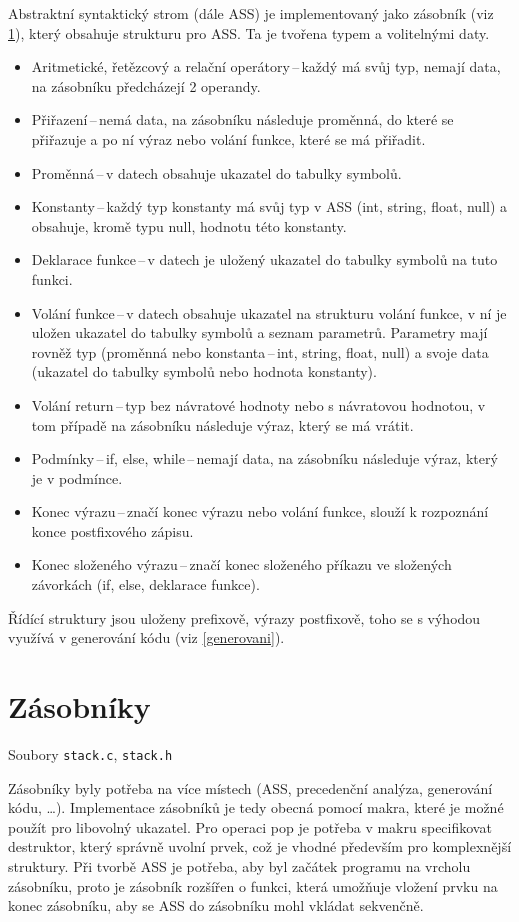 \documentclass[a4paper, 12pt]{article}
\begin{document}
    Abstraktní syntaktický strom (dále ASS) je implementovaný jako zásobník (viz \ref{zasobniky}), který obsahuje strukturu pro ASS. Ta je tvořena typem a volitelnými daty.
    \begin{itemize}
        \item Aritmetické, řetězcový a relační operátory\,--\,každý má svůj typ, nemají data, na zásobníku předcházejí 2 operandy.
        \item Přiřazení\,--\,nemá data, na zásobníku následuje proměnná, do které se přiřazuje a po ní výraz nebo volání funkce, které se má přiřadit.
        \item Proměnná\,--\,v datech obsahuje ukazatel do tabulky symbolů.
        \item Konstanty\,--\,každý typ konstanty má svůj typ v ASS (int, string, float, null) a obsahuje, kromě typu null, hodnotu této konstanty.
        \item Deklarace funkce\,--\,v datech je uložený ukazatel do tabulky symbolů na tuto funkci.
        \item Volání funkce\,--\,v datech obsahuje ukazatel na strukturu volání funkce, v ní je uložen ukazatel do tabulky symbolů a seznam parametrů. Parametry mají rovněž typ (proměnná nebo konstanta\,--\,int, string, float, null) a svoje data (ukazatel do tabulky symbolů nebo hodnota konstanty).
        \item Volání return\,--\,typ bez návratové hodnoty nebo s návratovou hodnotou, v tom případě na zásobníku následuje výraz, který se má vrátit.
        \item Podmínky\,--\,if, else, while\,--\,nemají data, na zásobníku následuje výraz, který je v podmínce.
        \item Konec výrazu\,--\,značí konec výrazu nebo volání funkce, slouží k rozpoznání konce postfixového zápisu.
        \item Konec složeného výrazu\,--\,značí konec složeného příkazu ve složených závorkách (if, else, deklarace funkce).
    \end{itemize}
    Řídící struktury jsou uloženy prefixově, výrazy postfixově, toho se s výhodou využívá v generování kódu (viz \ref{generovani}).
    \section{Zásobníky} \label{zasobniky}
    Soubory \texttt{stack.c}, \texttt{stack.h}

    Zásobníky byly potřeba na více místech (ASS, precedenční analýza, generování kódu, \ldots). Implementace zásobníků je tedy obecná pomocí makra, které je možné použít pro libovolný ukazatel. Pro operaci pop je potřeba v makru specifikovat destruktor, který správně uvolní prvek, což je vhodné především pro komplexnější struktury. Při tvorbě ASS je potřeba, aby byl začátek programu na vrcholu zásobníku, proto je zásobník rozšířen o funkci, která umožňuje vložení prvku na konec zásobníku, aby se ASS do zásobníku mohl vkládat sekvenčně.
\end{document}
